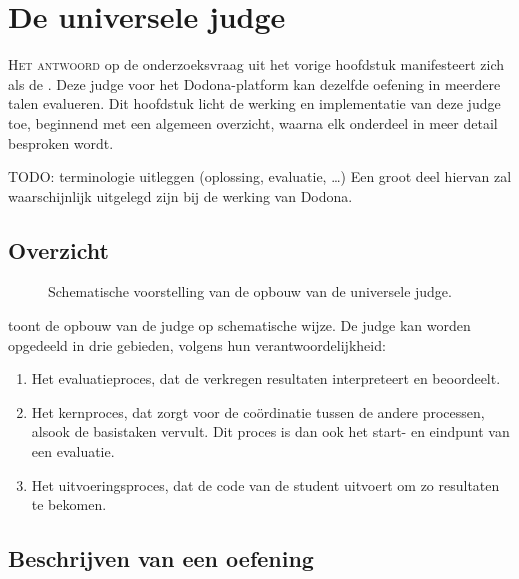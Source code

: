 \chapter{De universele judge}\label{ch:de-universele-judge}

\lettrine{H}{et antwoord} op de onderzoeksvraag uit het vorige hoofdstuk manifesteert zich als de .
Deze judge voor het Dodona-platform kan dezelfde oefening in meerdere talen evalueren.
Dit hoofdstuk licht de werking en implementatie van deze judge toe, beginnend met een algemeen overzicht, waarna elk onderdeel in meer detail besproken wordt.

TODO: terminologie uitleggen (oplossing, evaluatie, \ldots)
Een groot deel hiervan zal waarschijnlijk uitgelegd zijn bij de werking van Dodona.

\section{Overzicht}\label{sec:overzicht}

\begin{figure}
    \begin{adjustbox}{width=\textwidth}
        
    \end{adjustbox}
    \caption{Schematische voorstelling van de opbouw van de universele judge.}
    \label{fig:universal-judge}
\end{figure}

 toont de opbouw van de judge op schematische wijze.
De judge kan worden opgedeeld in drie gebieden, volgens hun verantwoordelijkheid:

\begin{enumerate}
    \item Het evaluatieproces, dat de verkregen resultaten interpreteert en beoordeelt.
    \item Het kernproces, dat zorgt voor de coördinatie tussen de andere processen, alsook de basistaken vervult.
          Dit proces is dan ook het start- en eindpunt van een evaluatie.
    \item Het uitvoeringsproces, dat de code van de student uitvoert om zo resultaten te bekomen.
\end{enumerate}

\section{Beschrijven van een oefening}\label{sec:beschrijven-van-een-oefening}

